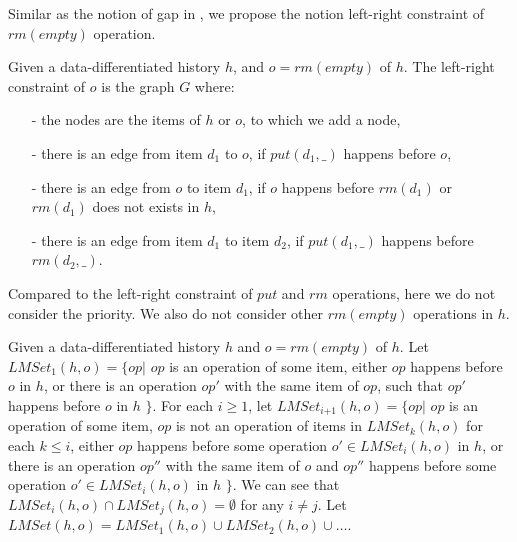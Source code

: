 \documentclass{llncs}
\begin{document}
Similar as the notion of gap in \cite{Bouajjani:2015}, we propose the notion left-right constraint of $\textit{rm}(\textit{empty})$ operation.

\begin{definition}\label{def:left-right constraint for rmEmpty operation}
Given a data-differentiated history $h$, and $o = \textit{rm}(\textit{empty})$ of $h$. The left-right constraint of $o$ is the graph $G$ where:

\begin{itemize}
\setlength{\itemsep}{0.5pt}
\item[-] the nodes are the items of $h$ or $o$, to which we add a node,

\item[-] there is an edge from item $d_1$ to $o$, if $\textit{put}(d_1,\_)$ happens before $o$,

\item[-] there is an edge from $o$ to item $d_1$, if $o$ happens before $\textit{rm}(d_1)$ or $\textit{rm}(d_1)$ does not exists in $h$,

\item[-] there is an edge from item $d_1$ to item $d_2$, if $\textit{put}(d_1,\_)$ happens before $\textit{rm}(d_2,\_)$.
\end{itemize}
\end{definition}

Compared to the left-right constraint of $\textit{put}$ and $\textit{rm}$ operations, here we do not consider the priority. We also do not consider other $\textit{rm}(\textit{empty})$ operations in $h$.

Given a data-differentiated history $h$ and $o = \textit{rm}(\textit{empty})$ of $h$. Let $\textit{LMSet}_1(h,o) = \{ \textit{op} \vert$ $\textit{op}$ is an operation of some item, either $\textit{op}$ happens before $o$ in $h$, or there is an operation $\textit{op}'$ with the same item of $\textit{op}$, such that $\textit{op}'$ happens before $o$ in $h$ $\}$. For each $i \geq 1$, let $\textit{LMSet}_{\textit{i+1}}(h,o) = \{ \textit{op} \vert$ $\textit{op}$ is an operation of some item, $\textit{op}$ is not an operation of items in $\textit{LMSet}_k(h,o)$ for each $k \leq i$, either $\textit{op}$ happens before some operation $o' \in \textit{LMSet}_i(h,o)$ in $h$, or there is an operation $\textit{op}''$ with the same item of $o$ and $\textit{op}''$ happens before some operation $o' \in \textit{LMSet}_i(h,o)$ in $h$ $\}$. We can see that $\textit{LMSet}_i(h,o) \cap \textit{LMSet}_j(h,o) = \emptyset$ for any $i \neq j$. Let $\textit{LMSet}(h,o) = \textit{LMSet}_1(h,o) \cup \textit{LMSet}_2(h,o) \cup \ldots$.
\end{document}
